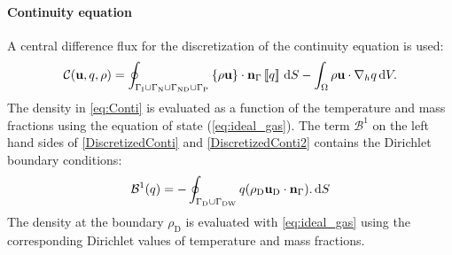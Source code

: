 \paragraph{Continuity equation}
A central difference flux for the discretization of the continuity equation is used:
\begin{equation}
	\mathcal{C}(\textbf{u},q, \rho)  =  \oint_{\Gamma_{\text{I}} \cup\Gamma_{\text{N}}\cup \Gamma_{\text{ND}}\cup \Gamma_{\text{P}}}{\left\{{\rho\textbf{u} }\right\}\cdot \textbf{n}_\Gamma\left[\!\left[{{q}}\right]\!\right] \,\mathrm{d} S} - \int_{\Omega}{\rho \textbf{u}\cdot \nabla_h q} \,\mathrm{d} V.  \label{eq:Conti}
\end{equation}
The density in \cref{eq:Conti} is evaluated as a function of the temperature and mass fractions using the equation of state (\cref{eq:ideal_gas}). The term $\mathcal{B}^1$ on the left hand sides of \cref{DiscretizedConti} and \cref{DiscretizedConti2}  contains the Dirichlet boundary conditions:
\begin{equation}
	\mathcal{B}^1(q) =  -\oint_{\Gamma_{\text{D}}\cup \Gamma_{\text{DW}}}{q(\rho_{\text{D}} \textbf{u}_{\text{D}} \cdot \textbf{n}_{\Gamma}). \,\mathrm{d} S}
\end{equation}
The density at the boundary  $\rho_{\text{D}}$ is evaluated with \cref{eq:ideal_gas} using the corresponding Dirichlet values of temperature and mass fractions.

